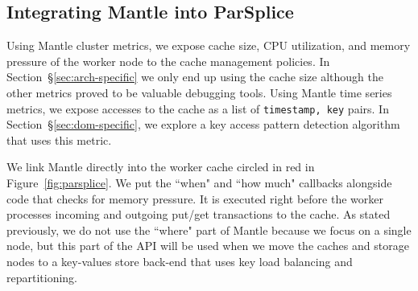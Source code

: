 \subsection{Integrating Mantle into ParSplice}

Using Mantle cluster metrics, we expose cache size, CPU utilization, and memory
pressure of the worker node to the cache management policies. In
Section~\S\ref{sec:arch-specific} we only end up using the cache size although
the other metrics proved to be valuable debugging tools. Using Mantle time
series metrics, we expose accesses to the cache as a list of \texttt{timestamp,
key} pairs. In Section~\S\ref{sec:dom-specific}, we explore a key access
pattern detection algorithm that uses this metric.

We link Mantle directly into the worker cache circled in red in
Figure~\ref{fig:parsplice}. We put the ``when" and ``how much" callbacks
alongside code that checks for memory pressure. It is executed right before the
worker processes incoming and outgoing put/get transactions to the cache. As
stated previously, we do not use the ``where" part of Mantle because we focus
on a single node, but this part of the API will be used when we move the caches
and storage nodes to a key-values store back-end that uses key load balancing and
repartitioning.
